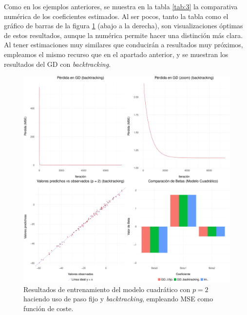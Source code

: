 \documentclass[11pt]{opticajnl}
\begin{document}
Como en los ejemplos anteriores, se muestra en la tabla \ref{tab:3} la comparativa numérica de los coeficientes estimados. Al ser pocos, tanto la tabla como el gráfico de barras de la figura \ref{fig:3} (abajo a la derecha), son visualizaciones óptimas de estos resultados, aunque la numérica permite hacer una distinción más clara. Al tener estimaciones muy similares que conducirán a resultados muy próximos, empleamos el mismo recurso que en el apartado anterior, y se muestran los resultados del GD con \textit{backtracking}. 

\begin{table}[h]
    \centering
    \caption{Coeficientes estimados para el modelo de regresión cuadrático  durante el entrenamiento.}
    \label{tab:3}
\end{table}

\begin{figure}[H]
\centering
\includegraphics[width=\textwidth]{fotos/plot_cuad.pdf}
\caption{Resultados de entrenamiento del modelo cuadrático con $p=2$ haciendo uso de paso fijo y \textit{backtracking}, empleando MSE como función de coste.}
\label{fig:3}
\end{figure}
\end{document}
